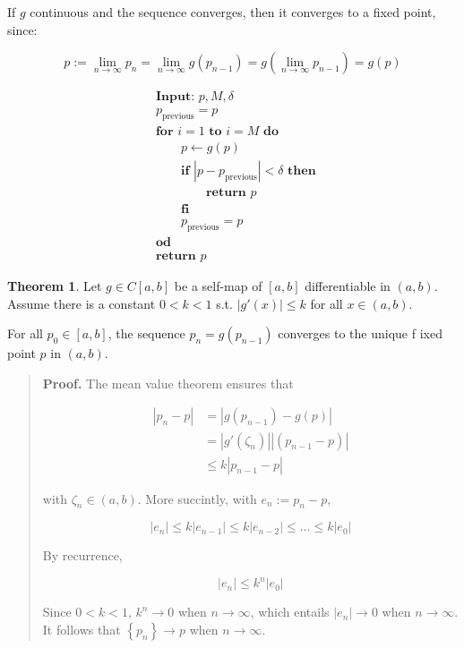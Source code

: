 \documentclass[12pt]{article}
\theoremstyle{definition}
\newtheorem{theorem}{Theorem}
\begin{document}
If $g$ continuous and the sequence converges, then it converges to a fixed
point, since: 

\begin{equation*}
    p := \lim_{n \to \infty} p_n = \lim_{n \to \infty} g(p_{n-1}) = g\left(
    \lim_{n \to \infty} p_{n-1} \right) = g(p)
\end{equation*}

\begin{align*}
&\textbf{Input: } p, M, \delta \\ 
&p_{\text{previous}} = p\\
&\textbf{for } i = 1 \textbf{ to } i = M \textbf{ do } \\ 
&\qquad p \leftarrow g(p) \\ 
&\qquad \textbf{if } \left| p - p_{\text{previous}} \right| < \delta \textbf{ then } \\ 
&\qquad\qquad \textbf{return } p \\ 
&\qquad\textbf{fi}\\ 
&\qquad p_{\text{previous}} = p\\ 
&\textbf{od}\\ 
&\textbf{return }p
\end{align*}


\begin{theorem}
    Let $g \in C[a, b]$ be a self-map of $[a, b]$ differentiable in $(a, b)$.
    Assume there is a constant $0 < k < 1$ s.t. $\left| g'(x) \right| \leq k$
    for all $x \in (a, b)$.

    For all $p_0 \in [a, b]$, the sequence $p_n = g(p_{n-1})$ converges to the
    unique f ixed point $p$ in $(a, b)$.
\end{theorem}


\small
\begin{quote}

\textbf{Proof.} The mean value theorem ensures that 

\begin{align*}
    \left| p_n - p \right| 
    &= \left| g(p_{n-1}) - g(p) \right| \\ 
    &= |g'(\zeta_n)||(p_{n-1} - p)| \\ 
    &\leq k \left| p_{n-1} - p \right| 
\end{align*}

with $\zeta_n \in (a, b)$. More succintly, with $e_n := p_n - p$,

\begin{equation*}
    |e_n| \leq k \left| e_{n-1} \right| \leq k \left| e_{n-2} \right| \leq
    \ldots \leq k \left| e_0 \right| 
\end{equation*}

By recurrence,

\begin{equation*}
    \left| e_n \right| \leq k^n\left| e_0 \right| 
\end{equation*}

Since $0 < k < 1$, $k^n \to 0$ when $n \to \infty$, which entails $\left| e_n
\right| \to 0$ when $n \to \infty$. It follows that $\left\{ p_n \right\} \to
p$ when $n \to \infty$.

\end{quote}
\normalsize
\end{document}
